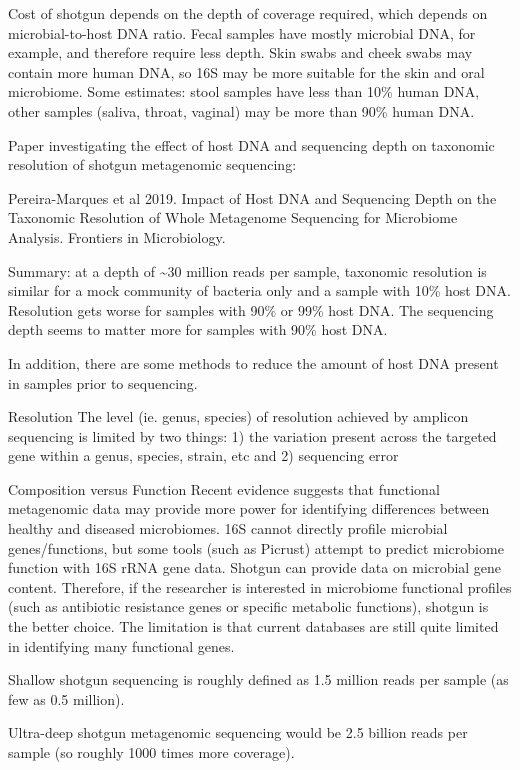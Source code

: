 \documentclass[
]{book}
\begin{document}
Cost of shotgun depends on the depth of coverage required, which depends on microbial-to-host DNA ratio. Fecal samples have mostly microbial DNA, for example, and therefore require less depth. Skin swabs and cheek swabs may contain more human DNA, so 16S may be more suitable for the skin and oral microbiome. Some estimates: stool samples have less than 10\% human DNA, other samples (saliva, throat, vaginal) may be more than 90\% human DNA.

Paper investigating the effect of host DNA and sequencing depth on taxonomic resolution of shotgun metagenomic sequencing:

Pereira-Marques et al 2019. Impact of Host DNA and Sequencing Depth on the Taxonomic Resolution of Whole Metagenome Sequencing for Microbiome Analysis. Frontiers in Microbiology.

Summary: at a depth of \textasciitilde30 million reads per sample, taxonomic resolution is similar for a mock community of bacteria only and a sample with 10\% host DNA. Resolution gets worse for samples with 90\% or 99\% host DNA. The sequencing depth seems to matter more for samples with 90\% host DNA.

In addition, there are some methods to reduce the amount of host DNA present in samples prior to sequencing.

Resolution
The level (ie. genus, species) of resolution achieved by amplicon sequencing is limited by two things: 1) the variation present across the targeted gene within a genus, species, strain, etc and 2) sequencing error

Composition versus Function
Recent evidence suggests that functional metagenomic data may provide more power for identifying differences between healthy and diseased microbiomes. 16S cannot directly profile microbial genes/functions, but some tools (such as Picrust) attempt to predict microbiome function with 16S rRNA gene data. Shotgun can provide data on microbial gene content. Therefore, if the researcher is interested in microbiome functional profiles (such as antibiotic resistance genes or specific metabolic functions), shotgun is the better choice. The limitation is that current databases are still quite limited in identifying many functional genes.

Shallow shotgun sequencing is roughly defined as 1.5 million reads per sample (as few as 0.5 million).

Ultra-deep shotgun metagenomic sequencing would be 2.5 billion reads per sample (so roughly 1000 times more coverage).
\end{document}
